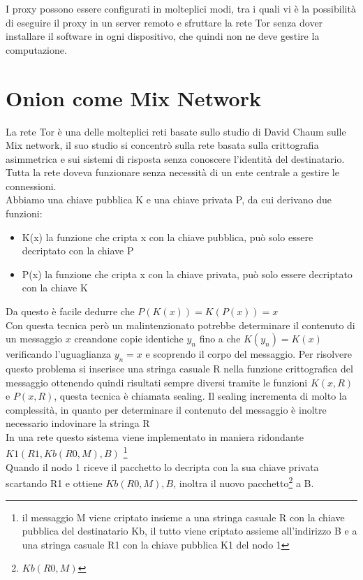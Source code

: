 I proxy possono essere configurati in molteplici modi, tra i quali vi è la possibilità di eseguire il proxy in un server remoto e sfruttare la rete Tor senza dover installare il software in ogni dispositivo, che quindi non ne deve gestire la computazione.
\cite{OnionRouting}

\newpage
\section{Onion come Mix Network} \label{sec:OnionMixNetwork}
La rete Tor è una delle molteplici reti basate sullo studio di David Chaum sulle Mix network, il suo studio si concentrò sulla rete basata sulla crittografia asimmetrica e sui sistemi di risposta senza conoscere l'identità del destinatario. Tutta la rete doveva funzionare senza necessità di un ente centrale a gestire le connessioni. \\
Abbiamo una chiave pubblica K e una chiave privata P, da cui derivano due funzioni:
\begin{itemize}
    \item K(x) la funzione che cripta x con la chiave pubblica, può solo essere decriptato con la chiave P
    \item P(x) la funzione che cripta x con la chiave privata, può solo essere decriptato con la chiave K
\end{itemize}
Da questo è facile dedurre che $P(K(x)) = K(P(x)) = x$ \\
Con questa tecnica però un malintenzionato potrebbe determinare il contenuto di un messaggio $x$ creandone copie identiche $y_n$ fino a che $K(y_n) = K(x)$ verificando l'uguaglianza $y_n = x$ e scoprendo il corpo del messaggio. 
Per risolvere questo problema si inserisce una stringa casuale R nella funzione crittografica del messaggio ottenendo quindi risultati sempre diversi tramite le funzioni $K(x,R)$ e $P(x,R)$, questa tecnica è chiamata sealing. 
Il sealing incrementa di molto la complessità, in quanto per determinare il contenuto del messaggio è inoltre necessario indovinare la stringa R \\
In una rete questo sistema viene implementato in maniera ridondante \\ 
$K1(R1, Kb(R0, M), B)$ \footnote{il messaggio M viene criptato insieme a una stringa casuale R con la chiave pubblica del destinatario Kb, il tutto viene criptato assieme all'indirizzo B e a una stringa casuale R1 con la chiave pubblica K1 del nodo 1}\\
Quando il nodo 1 riceve il pacchetto lo decripta con la sua chiave privata scartando R1 e ottiene $Kb(R0, M), B$, inoltra il nuovo pacchetto\footnote{$Kb(R0, M)$} a B. 
